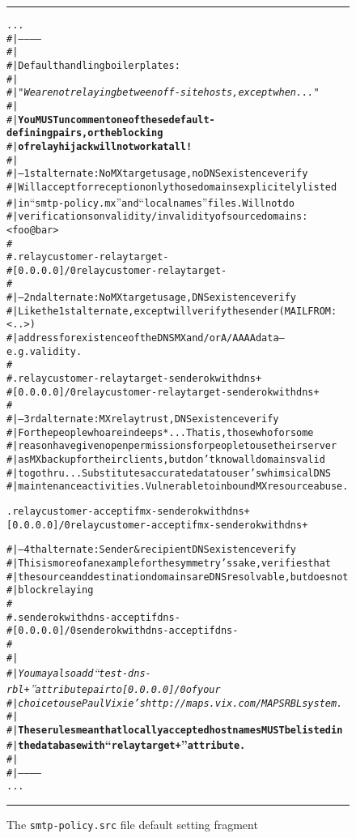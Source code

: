 \begin{figure*}[ht]
\begin{alltt}\medskip\hrule\medskip\setlength{\baselineskip}{0.8\baselineskip}
...
#|-----------
#|
#| {\rm Default handling boilerplates:}
#|
#|   {\rm\em "We are not relaying between off-site hosts, except when ..."}
#|
#| {\bf You MUST uncomment one of these default-defining pairs, or the blocking}
#| {\bf of relay hijack will not work at all !}
#|
#| {\rm -- 1st alternate: No MX target usage, no DNS existence verify}
#|    {\rm Will accept for reception only those domains explicitely listed}
#|    {\rm in ``smtp-policy.mx'' and  ``localnames''  files.  Will not do}
#|    {\rm verifications on validity/invalidity of source domains:}<foo@bar>
#
# .             relaycustomer - relaytarget -
# [0.0.0.0]/0   relaycustomer - relaytarget -
#
#| {\rm -- 2nd alternate: No MX target usage, DNS existence verify}
#|    {\rm Like the 1st alternate, except will verify the sender} (MAIL FROM:<..>)
#|    {\rm address for existence of the DNS MX and/or A/AAAA data -- e.g. validity.}
#
# .             relaycustomer - relaytarget - senderokwithdns +
# [0.0.0.0]/0   relaycustomer - relaytarget - senderokwithdns +
#
#| {\rm -- 3rd alternate: MX relay trust, DNS existence verify}
#|    {\rm For the people who are in deep s*...  That is, those who for some}
#|    {\rm reason have given open permissions for people to use their server}
#|    {\rm as MX backup for their clients, but don't know all domains valid}
#|    {\rm to go thru...  Substitutes accurate data to user's whimsical DNS}
#|    {\rm maintenance activities.  Vulnerable to inbound MX resource abuse.}

.               relaycustomer - acceptifmx - senderokwithdns +
[0.0.0.0]/0     relaycustomer - acceptifmx - senderokwithdns +

#| {\rm -- 4th alternate: Sender & recipient DNS existence verify}
#|    {\rm This is more of an example for the symmetry's sake, verifies that}
#|    {\rm the source and destination domains are DNS resolvable, but does not}
#|    {\rm block relaying}
#
# .             senderokwithdns - acceptifdns -
# [0.0.0.0]/0   senderokwithdns - acceptifdns -
#
#|
#|  {\rm\em You may also add  ``test-dns-rbl +''  attribute pair to [0.0.0.0]/0 of your}
#|  {\rm\em choice to use Paul Vixie's  http://maps.vix.com/  MAPS RBL system.}
#|
#| {\bf These rules mean that locally accepted hostnames MUST be listed in}
#| {\bf the database with ``relaytarget +'' attribute.}
#|
#|-----------
...
\medskip\hrule\end{alltt}\medskip
\caption{\label{fig:adm:smtp-policy-boiler}
The {\tt smtp-policy.src} file default setting fragment}
\end{figure*}
